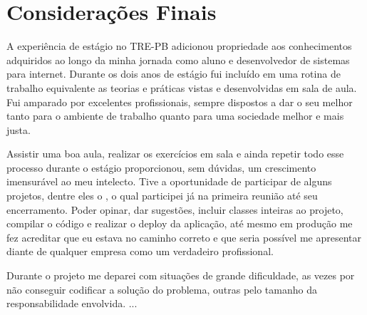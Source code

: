
\chapter{Considerações Finais}
\label{chap:consideracoesFinais}


A experiência de estágio no TRE-PB adicionou propriedade aos conhecimentos adquiridos ao longo da minha jornada como aluno e desenvolvedor de sistemas para internet. 
Durante os dois anos de estágio fui incluído em uma rotina de trabalho equivalente as teorias e práticas vistas e desenvolvidas em sala de aula. 
Fui amparado por excelentes profissionais, sempre dispostos a dar o seu melhor tanto para o ambiente de trabalho quanto para uma sociedade melhor e mais justa.

Assistir uma boa aula, realizar os exercícios em sala e ainda repetir todo esse processo durante o estágio proporcionou, sem dúvidas, um crescimento imensurável ao meu intelecto. Tive a oportunidade de participar de alguns projetos, dentre eles o \imprimirtitulo \space, o qual participei já na primeira reunião até seu encerramento. Poder opinar, dar sugestões, incluir classes inteiras ao projeto, compilar o código e realizar o deploy da aplicação, até mesmo em produção me fez acreditar que eu estava no caminho correto e que seria possível me apresentar diante de qualquer empresa como um verdadeiro profissional.

Durante o projeto me deparei com situações de grande dificuldade, as vezes por não conseguir codificar a solução do problema, outras pelo tamanho da responsabilidade envolvida. ... 